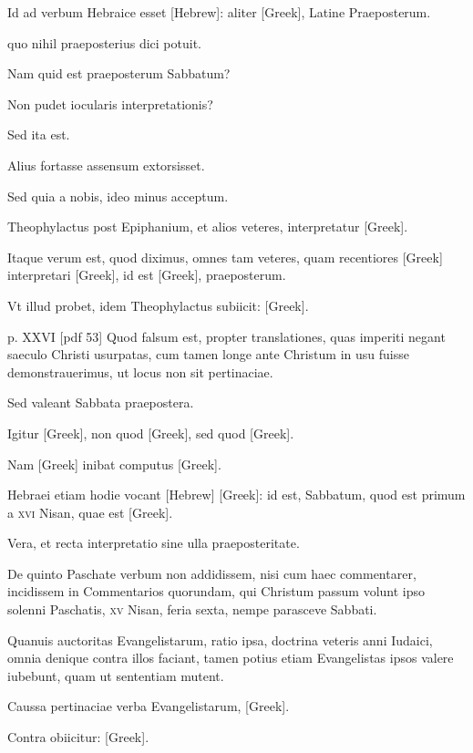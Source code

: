 \begin{parnumbers}
Id ad verbum
Hebraice esset \texthebrew{[Hebrew]}:
 aliter \textgreek{[Greek]}, Latine Praeposterum.

quo nihil praeposterius dici potuit.

Nam quid est praeposterum Sabbatum?

Non pudet iocularis interpretationis?

Sed ita est.

Alius fortasse assensum extorsisset.

Sed quia a nobis, ideo
minus acceptum.

Theophylactus post Epiphanium, et alios veteres,
interpretatur \textgreek{[Greek]}.

Itaque verum est, quod diximus, omnes tam veteres, quam
recentiores \textgreek{[Greek]} interpretari
 \textgreek{[Greek]}, id est \textgreek{[Greek]},
praeposterum.

Vt illud probet, idem Theophylactus
subiicit: \textgreek{[Greek]}.

\clearpage
p. XXVI [pdf 53]
Quod falsum est,
propter translationes, quas imperiti negant saeculo Christi usurpatas,
cum tamen longe ante Christum in usu fuisse demonstrauerimus,
ut locus non sit pertinaciae.

Sed valeant Sabbata praepostera.

Igitur \textgreek{[Greek]}, non quod \textgreek{[Greek]}, sed
quod \textgreek{[Greek]}.

Nam \textgreek{[Greek]} inibat
computus \textgreek{[Greek]}.

Hebraei etiam hodie vocant \texthebrew{[Hebrew]}
\textgreek{[Greek]}: id est, Sabbatum, quod est primum a
\textsc{xvi} Nisan, quae est \textgreek{[Greek]}.

Vera, et recta interpretatio sine ulla praeposteritate.

De quinto Paschate verbum non addidissem,
nisi cum haec commentarer, incidissem in Commentarios quorundam,
qui Christum passum volunt ipso solenni Paschatis, \textsc{xv}
Nisan, feria sexta, nempe parasceve Sabbati.

Quanuis auctoritas
Evangelistarum, ratio ipsa, doctrina veteris anni Iudaici, omnia
denique contra illos faciant, tamen potius etiam Evangelistas ipsos
valere iubebunt, quam ut sententiam mutent.

Caussa pertinaciae
verba Evangelistarum, \textgreek{[Greek]}.

Contra obiicitur:
\textgreek{[Greek]}.


\end{parnumbers}
